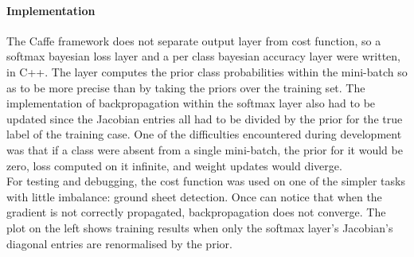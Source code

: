 \documentclass[a4paper,11pt]{article}
\begin{document}
\paragraph{Implementation}

The Caffe framework does not separate output layer from cost function, so a softmax bayesian loss layer and a per class bayesian accuracy layer were written, in C++. The layer computes the prior class probabilities within the mini-batch so as to be more precise than by taking the priors over the training set. The implementation of backpropagation within the softmax layer also had to be updated since the Jacobian entries all had to be divided by the prior for the true label of the training case. One of the difficulties encountered during development was that if a class were absent from a single mini-batch, the prior for it would be zero, loss computed on it infinite, and weight updates would diverge. \\

For testing and debugging, the cost function was used on one of the simpler tasks with little imbalance: ground sheet detection. Once can notice that when the gradient is not correctly propagated, backpropagation does not converge. The plot on the left shows training results when only the softmax layer's Jacobian's diagonal entries are renormalised by the prior. \\
\end{document}
